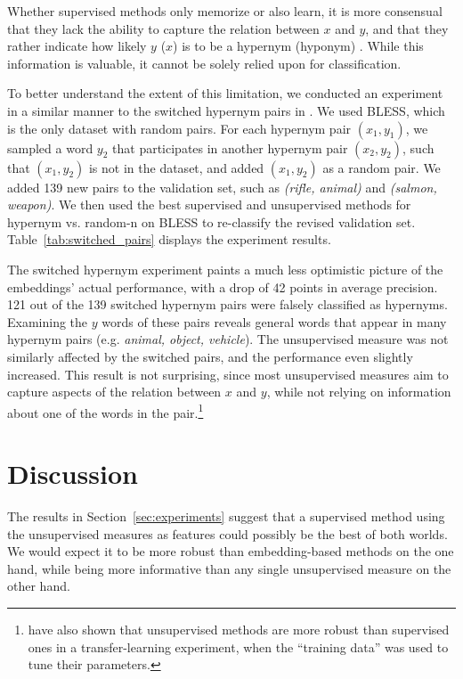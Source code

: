 \documentclass[11pt]{article}
\begin{document}
Whether supervised methods only memorize or also learn, it is more consensual that they lack the ability to capture the relation between $x$ and $y$, and that they rather indicate how likely $y$ ($x$) is to be a hypernym (hyponym) \cite{levy2015supervised,santus2016nine,shwartz2016improving,roller2016relations}. While this information is valuable, it cannot be solely relied upon for classification. 

To better understand the extent of this limitation, we conducted an experiment in a similar manner to the switched hypernym pairs in . We used BLESS, which is the only dataset with random pairs. For each hypernym pair $(x_1,y_1)$, we sampled a word $y_2$ that participates in another hypernym pair $(x_2,y_2)$, such that $(x_1,y_2)$ is not in the dataset, and added $(x_1,y_2)$ as a random pair. We added 139 new pairs to the validation set, such as \emph{(rifle, animal)} and \emph{(salmon, weapon)}. We then used the best supervised and unsupervised methods for hypernym vs. random-n on BLESS to re-classify the revised validation set. Table~\ref{tab:switched_pairs} displays the experiment results. 

The switched hypernym experiment paints a much less optimistic picture of the embeddings' actual performance, with a drop of 42 points in average precision. 121 out of the 139 switched hypernym pairs were falsely classified as hypernyms. Examining the $y$ words of these pairs reveals general words that appear in many hypernym pairs (e.g. \emph{animal, object, vehicle}).  The unsupervised measure was not similarly affected by the switched pairs, and the performance even slightly increased. This result is not surprising, since most unsupervised measures aim to capture aspects of the relation between $x$ and $y$, while not relying on information about one of the words in the pair.\footnote{ have also shown that unsupervised methods are more robust than supervised ones in a transfer-learning experiment, when the ``training data'' was used to tune their parameters.}



\section{Discussion}
\label{sec:discussion}

The results in Section~\ref{sec:experiments} suggest that a supervised method using the unsupervised measures as features could possibly be the best of both worlds. We would expect it to be more robust than embedding-based methods on the one hand, while being more informative than any single unsupervised measure on the other hand. 
\end{document}

